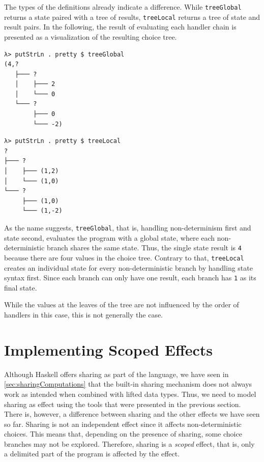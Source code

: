 \documentclass[a4paper, 11pt, fleqn, twoside, abstract=on]{scrreprt}
\newcommand{\hinl}[1]{\texttt{#1}}
\begin{document}
The types of the definitions already indicate a difference.
While \hinl{treeGlobal} returns a state paired with a tree of results, \hinl{treeLocal} returns a tree of state and result pairs.
In the following, the result of evaluating each handler chain is presented as a visualization of the resulting choice tree.

\vspace{0.32cm}

\begin{minipage}{.465 \linewidth}
\begin{verbatim}
λ> putStrLn . pretty $ treeGlobal
(4,?
   ├─── ?
   │    ├─── 2
   │    └─── 0
   └─── ?
        ├─── 0
        └─── -2)
\end{verbatim}
\end{minipage}
\hfill
\vline
\hfill
\begin{minipage}{.475 \linewidth}
\begin{verbatim}
λ> putStrLn . pretty $ treeLocal
?
├─── ?
│    ├─── (1,2)
│    └─── (1,0)
└─── ?
     ├─── (1,0)
     └─── (1,-2)
\end{verbatim}
\end{minipage}

\vspace{0.32cm}

As the name suggests, \hinl{treeGlobal}, that is, handling non-determinism first and state second, evaluates the program with a global state, where each non-deterministic branch shares the same state.
Thus, the single state result is \hinl{4} because there are four values in the choice tree.
Contrary to that, \hinl{treeLocal} creates an individual state for every non-deterministic branch by handling state syntax first.
Since each branch can only have one result, each branch has \hinl{1} as its final state.

While the values at the leaves of the tree are not influenced by the order of handlers in this case, this is not generally the case.

\section{Implementing Scoped Effects}
\label{sec:sharing}

Although Haskell offers sharing as part of the language, we have seen in \autoref{sec:sharingComputations} that the built-in sharing mechanism does not always work as intended when combined with lifted data types.
Thus, we need to model sharing as effect using the tools that were presented in the previous section.
There is, however, a difference between sharing and the other effects we have seen so far.
Sharing is not an independent effect since it affects non-deterministic choices.
This means that, depending on the presence of sharing, some choice branches may not be explored.
Therefore, sharing is a \textit{scoped} effect, that is, only a delimited part of the program is affected by the effect.
\end{document}
